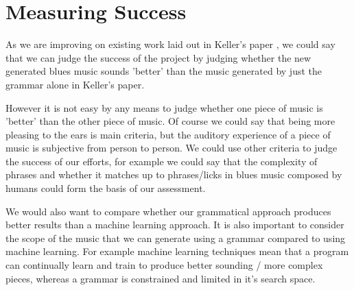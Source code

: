 \documentclass[pdftex,12pt,a4paper]{report}
\begin{document}
\section{Measuring Success}
As we are improving on existing work laid out in Keller's paper \cite{keller07}, we could say that we can judge the success of the project by judging whether the new generated blues music sounds 'better' than the music generated by just the grammar alone in Keller's paper.

However it is not easy by any means to judge whether one piece of music is 'better' than the other piece of music. Of course we could say that being more pleasing to the ears is main criteria, but the auditory experience of a piece of music is subjective from person to person. We could use other criteria to judge the success of our efforts, for example we could say that the complexity of phrases and whether it matches up to phrases/licks in blues music composed by humans could form the basis of our assessment.

We would also want to compare whether our grammatical approach produces better results than a machine learning approach. It is also important to consider the scope of the music that we can generate using a grammar compared to using machine learning. For example machine learning techniques mean that a program can continually learn and train to produce better sounding / more complex pieces, whereas a grammar is constrained and limited in it's search space. 





\end{document}
